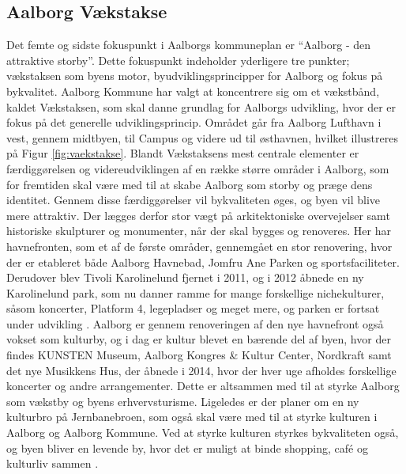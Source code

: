 \subsection{Aalborg Vækstakse}
Det femte og sidste fokuspunkt i Aalborgs kommuneplan er “Aalborg - den attraktive storby”. Dette fokuspunkt indeholder yderligere tre punkter; vækstaksen som byens motor, byudviklingsprincipper for Aalborg og fokus på bykvalitet. 
\newline
\newline
Aalborg Kommune har valgt at koncentrere sig om et vækstbånd, kaldet Vækstaksen, som skal danne grundlag for Aalborgs udvikling, hvor der er fokus på det generelle udviklingsprincip. Området går fra Aalborg Lufthavn i vest, gennem midtbyen, til Campus og videre ud til østhavnen, hvilket illustreres på Figur \ref{fig:vaekstakse}. 
\newline \indent{     }  Blandt Vækstaksens mest centrale elementer er færdiggørelsen og videreudviklingen af en række større områder i Aalborg, som for fremtiden skal være med til at skabe Aalborg som storby og præge dens identitet. Gennem disse færdiggørelser vil bykvaliteten øges, og byen vil blive mere attraktiv. Der lægges derfor stor vægt på arkitektoniske overvejelser samt historiske skulpturer og monumenter, når der skal bygges og renoveres. 
\newline \indent{     }  Her har havnefronten, som et af de første områder, gennemgået en stor renovering, hvor der er etableret både Aalborg Havnebad, Jomfru Ane Parken og sportsfaciliteter. Derudover blev Tivoli Karolinelund fjernet i 2011, og i 2012 åbnede en ny Karolinelund park, som nu danner ramme for mange forskellige nichekulturer, såsom koncerter, Platform 4, legepladser og meget mere, og parken er fortsat under udvikling \citep{jomfruaneparken} \citep{karolinelund}. 
\newline \indent{     }  Aalborg er gennem renoveringen af den nye havnefront også vokset som kulturby, og i dag er kultur blevet en bærende del af byen, hvor der findes KUNSTEN Museum, Aalborg Kongres \& Kultur Center, Nordkraft samt det nye Musikkens Hus, der åbnede i 2014, hvor der hver uge afholdes forskellige koncerter og andre arrangementer. Dette er altsammen med til at styrke Aalborg som vækstby og byens erhvervsturisme. Ligeledes er der planer om en ny kulturbro på Jernbanebroen, som også skal være med til at styrke kulturen i Aalborg og Aalborg Kommune. Ved at styrke kulturen styrkes bykvaliteten også, og byen bliver en levende by, hvor det er muligt at binde shopping, café og kulturliv sammen \citep{kulturbro} \citep{musikkenshus}.
